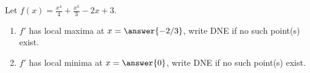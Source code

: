 \documentclass{ximera}
\author{Gregory Hartman \and Matthew Carr}
\begin{document}
\begin{exercise}






Let $f(x)=\frac{x^4}{4}+\frac{x^3}{3}-2x+3$.
\begin{enumerate}
\item		$f'$ has local maxima at $x=\answer{-2/3}$, write DNE if no such point(s) exist.
\item		$f'$ has local minima at $x=\answer{0}$, write DNE if no such point(s) exist.
\end{enumerate}

\end{exercise}
\end{document}
